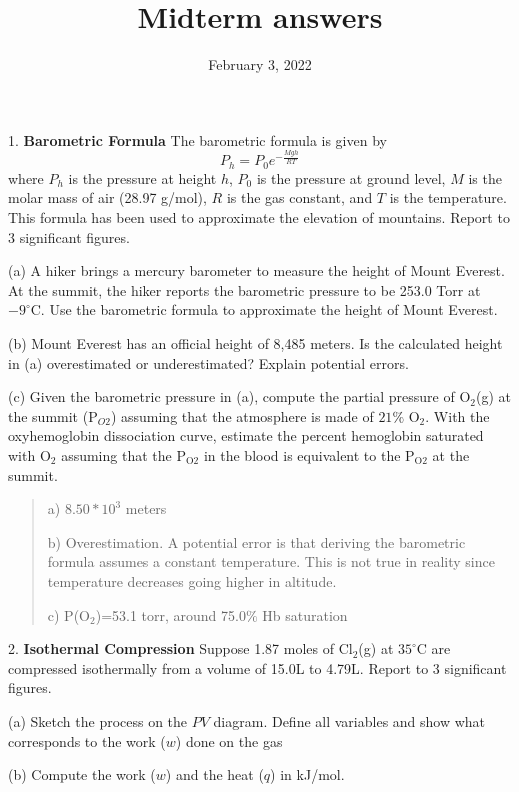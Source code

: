 \documentclass[11pt]{article}
\title{\textbf{Midterm answers}}
\date{February 3, 2022}
\begin{document}
\maketitle

1. \textbf{Barometric Formula} The barometric formula is given by
\begin{equation*}
  P_h = P_0 e^{-\frac{Mgh}{RT}}
\end{equation*}
where $P_h$ is the pressure at height $h$, $P_0$ is the pressure at ground level,
$M$ is the molar mass of air (28.97 g/mol), $R$ is the gas constant, and $T$ is the
temperature. This formula has been used to approximate the elevation of mountains.
Report to 3 significant figures.

(a) A hiker brings a mercury barometer to measure the height of Mount Everest. At the
summit, the hiker reports the barometric pressure to be 253.0 Torr at $-9^\circ\text{C}$.
Use the barometric formula to approximate the height of Mount Everest.

(b) Mount Everest has an official height of 8,485 meters. Is the calculated height in
(a) overestimated or underestimated? Explain potential errors.

(c) Given the barometric pressure in (a), compute the partial pressure of O$_2$(g) at the summit
(P$_{O2}$) assuming that the atmosphere is made of $21\%$ O$_2$. With the oxyhemoglobin dissociation
curve, estimate the percent hemoglobin saturated with O$_2$ assuming that the P$_{\text{O}2}$ in the blood
is equivalent to the P$_{\text{O}2}$ at the summit.

\begin{quote}
  {\color{blue}
    a) $8.50*10^3$ meters

    b) Overestimation. A potential error is that deriving the barometric formula assumes
    a constant temperature. This is not true in reality since temperature decreases
    going higher in altitude.

    c) P(O$_2$)=53.1 torr, around 75.0$\%$ Hb saturation
  }
\end{quote}

2. \textbf{Isothermal Compression} Suppose 1.87 moles of Cl$_2$(g) at $35^\circ\text{C}$ are
compressed isothermally from a volume of 15.0L to 4.79L. Report to 3 significant figures.

(a) Sketch the process on the $PV$ diagram. Define all variables and show what corresponds
to the work ($w$) done on the gas

(b) Compute the work ($w$) and the heat ($q$) in kJ/mol.
\end{document}
